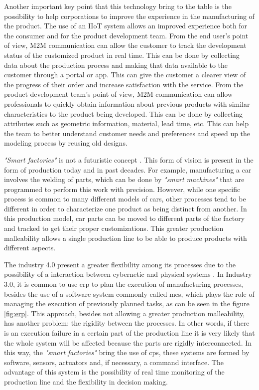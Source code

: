 Another important key point that this technology bring to the table is the possibility to help  corporations to improve the experience in the manufacturing of the product.  The use of an IIoT system allows an improved experience both for the consumer and for the product development team. From the end user's point of view, M2M communication can allow the customer to track the development status of the customized product in real time. This can be done by collecting data about the production process and making that data available to the customer through a portal or app. This can give the customer a clearer view of the progress of their order and increase satisfaction with the service. From the product development team's point of view, M2M communication can allow professionals to quickly obtain information about previous products with similar characteristics to the product being developed. This can be done by collecting attributes such as geometric information, material, lead time, etc. This can help the team to better understand customer needs and preferences and speed up the modeling process by reusing old designs.

\emph{"Smart factories"} is not a futuristic concept \textcite{Gilchrist2016}  \textcite{Gilchrist2016}. This form of vision is present in the form of production today and in past decades. For example, manufacturing a car involves the welding of parts, which can be done by \emph{"smart machines"} that are programmed to perform this work with precision. However, while one specific process is common to many different models of cars, other processes tend to be different in order to characterize one product as being distinct from another. In this production model, car parts can be moved to different parts of the factory and tracked to get their proper customizations. This greater production malleability allows a single production line to be able to produce products with different aspects.

The industry 4.0 present a greater flexibility among its processes due to the possibility of a interaction between cybernetic and physical systems \cite{Gilchrist2016}. In Industry 3.0, it is common to use \acrfull{erp} to plan the execution of manufacturing processes, besides the use of a software system commonly called \acrfull{mes}, which plays the role of managing the execution of previously planned tasks, as can be seen in the figure \ref{fig:erp}. This approach, besides not allowing a greater production malleability, has another problem: the rigidity between the processes. In other words, if there is an execution failure in a certain part of the production line it is very likely that the whole system will be affected because the parts are rigidly interconnected. In this way, the  \emph{"smart factories"} bring the use of \acrfull{cps}, these systems are formed by software, sensors, actuators and, if necessary, a command interface. The advantage of this system is the possibility of real time monitoring of the production line and the flexibility in decision making.

